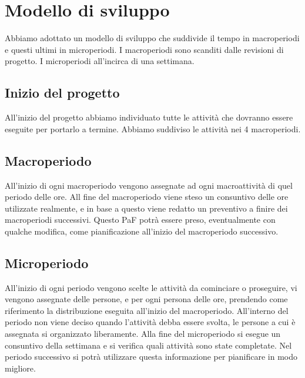\section{Modello di sviluppo}
Abbiamo adottato un modello di sviluppo che suddivide il tempo in macroperiodi e questi ultimi in microperiodi. \newline
I macroperiodi sono scanditi dalle revisioni di progetto. \newline
I microperiodi all'incirca di una settimana.

\subsection{Inizio del progetto}
All'inizio del progetto abbiamo individuato tutte le attività che dovranno essere eseguite per portarlo a termine.
Abbiamo suddiviso le attività nei 4 macroperiodi.
\subsection{Macroperiodo}
All'inizio di ogni macroperiodo vengono assegnate ad ogni macroattività di quel periodo delle ore.
All fine del macroperiodo viene steso un consuntivo delle ore utilizzate realmente, e in base a questo viene redatto un preventivo a finire dei macroperiodi successivi. Questo PaF potrà essere preso, eventualmente con qualche modifica, come pianificazione all'inizio del macroperiodo successivo.
\subsection{Microperiodo}
All'inizio di ogni periodo vengono scelte le attività da cominciare o proseguire, vi vengono assegnate delle persone, e per ogni persona delle ore, prendendo come riferimento la distribuzione eseguita all'inizio del macroperiodo. \newline
All'interno del periodo non viene deciso quando l'attività debba essere svolta, le persone a cui è assegnata si organizzato liberamente. \newline
Alla fine del microperiodo si esegue un consuntivo della settimana e si verifica quali attività sono state completate. Nel periodo successivo si potrà utilizzare questa informazione per pianificare in modo migliore.

